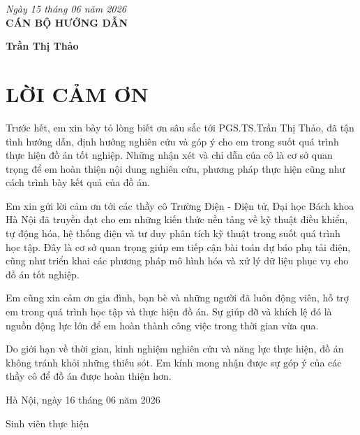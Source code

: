 \documentclass{thesis}
\begin{document}
\vspace{6pt}
\hspace{7cm}\textit{Ngày 15 tháng 06 năm 2026}\\
\vspace{2pt}
\hspace{8.5cm}\textbf{CÁN BỘ HƯỚNG DẪN} \\

\vspace{36pt}

\hspace{8.5cm}\textbf{Trần Thị Thảo}

\thispagestyle{empty}
    \newpage
                
\section*{LỜI CẢM ƠN}
    \thispagestyle{empty}
Trước hết, em xin bày tỏ lòng biết ơn sâu sắc tới PGS.TS.Trần Thị Thảo, đã tận tình hướng dẫn, định hướng nghiên cứu và góp ý cho em trong suốt quá trình thực hiện đồ án tốt nghiệp. Những nhận xét và chỉ dẫn của cô là cơ sở quan trọng để em hoàn thiện nội dung nghiên cứu, phương pháp thực hiện cũng như cách trình bày kết quả của đồ án.

Em xin gửi lời cảm ơn tới các thầy cô Trường Điện - Điện tử, Đại học Bách khoa Hà Nội đã truyền đạt cho em những kiến thức nền tảng về kỹ thuật điều khiển, tự động hóa, hệ thống điện và tư duy phân tích kỹ thuật trong suốt quá trình học tập. Đây là cơ sở quan trọng giúp em tiếp cận bài toán dự báo phụ tải điện, cũng như triển khai các phương pháp mô hình hóa và xử lý dữ liệu phục vụ cho đồ án tốt nghiệp.

Em cũng xin cảm ơn gia đình, bạn bè và những người đã luôn động viên, hỗ trợ em trong quá trình học tập và thực hiện đồ án. Sự giúp đỡ và khích lệ đó là nguồn động lực lớn để em hoàn thành công việc trong thời gian vừa qua.

Do giới hạn về thời gian, kinh nghiệm nghiên cứu và năng lực thực hiện, đồ án không tránh khỏi những thiếu sót. Em kính mong nhận được sự góp ý của các thầy cô để đồ án được hoàn thiện hơn.

\vspace{6pt}
    \hspace{7cm}Hà Nội, ngày 16 tháng 06 năm 2026
        
        \hspace{8.6cm} Sinh viên thực hiện      %
\end{document}
